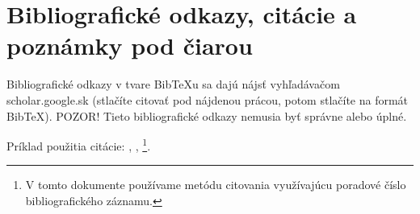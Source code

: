 \section*{Bibliografické odkazy, citácie a poznámky pod čiarou}
Bibliografické odkazy v tvare BibTeXu sa dajú nájsť vyhľadávačom scholar.google.sk (stlačíte citovať pod nájdenou prácou, potom stlačíte na formát BibTeX). POZOR! Tieto bibliografické odkazy nemusia byť správne alebo úplné.

Príklad použitia citácie: \cite{einstein}, \cite{latexcompanion}, \cite{knuthwebsite}\footnote{V tomto dokumente používame metódu citovania využívajúcu poradové číslo bibliografického záznamu.}.
